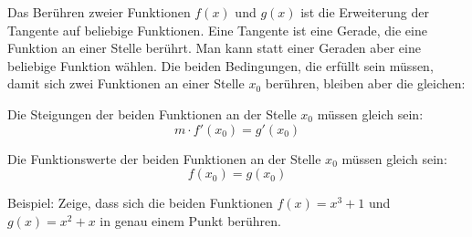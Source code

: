Das Berühren zweier Funktionen \(f(x)\) und \(g(x)\) ist die Erweiterung der Tangente auf beliebige Funktionen. Eine Tangente ist eine Gerade, die eine Funktion an einer Stelle berührt. Man kann statt einer Geraden aber eine beliebige Funktion wählen. Die beiden Bedingungen, die erfüllt sein müssen, damit sich zwei Funktionen an einer Stelle \(x_0\) berühren, bleiben aber die gleichen:
\begin{tcolorbox}

    \bigskip

	\textcolor{loestc}{Die Steigungen der beiden Funktionen an der Stelle \(x_0\) müssen gleich sein:
		\[m\cdot f'(x_0)=g'(x_0)\]}
\end{tcolorbox}
\begin{tcolorbox}

    \bigskip

	\textcolor{loestc}{Die Funktionswerte der beiden Funktionen an der Stelle \(x_0\) müssen gleich sein:
		\[f(x_0)=g(x_0)\]}
\end{tcolorbox}
Beispiel: Zeige, dass sich die beiden Funktionen \(f(x)=x^3+1\) und \(g(x)=x^2+x\) in genau einem Punkt berühren.\vspace{0.5cm}

